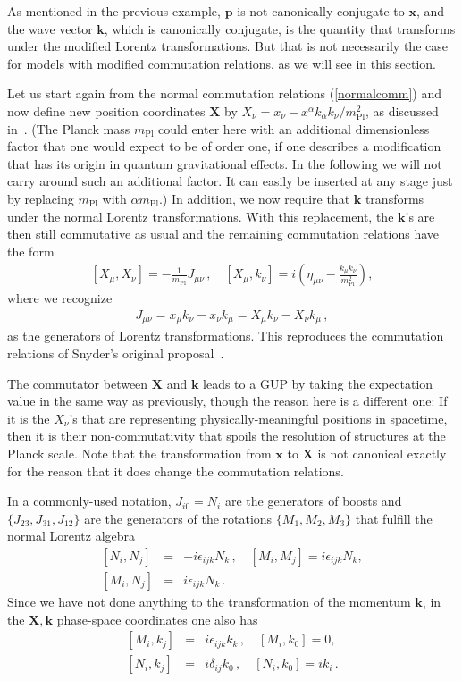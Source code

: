 \documentclass{article}
\def\beqn{\begin{eqnarray}}
\def\eeqn{\end{eqnarray}}
\begin{document}
As mentioned in the previous example, $\mathbf{p}$ is not canonically conjugate to $\mathbf{x}$,
and the wave vector $\mathbf{k}$, which is canonically conjugate, is the quantity that transforms under the modified Lorentz transformations. 
But that is not necessarily the case for models with modified commutation relations, as we will see in this section.

Let us start again from the normal commutation relations (\ref{normalcomm}) and now define new position coordinates $\mathbf{X}$ by $X_\nu = x_\nu - x^\alpha k_\alpha k_\nu/ m_{\mathrm{Pl}}^2$, as discussed in~\cite{Girelli:2007sz}. (The Planck mass $m_{\mathrm{Pl}}$ could enter here with an additional
dimensionless factor that one would expect to be of order one, if one describes a modification that has its origin in quantum 
gravitational effects. In the following we will not carry around
such an additional factor. It can easily be inserted at any stage just by replacing $m_{\mathrm{Pl}}$ with $\alpha m_{\mathrm{Pl}}$.) In addition, we
now require that $\mathbf{k}$ transforms under the normal Lorentz transformations. With this
replacement, the $\mathbf{k}$'s are then still commutative as usual and the remaining commutation relations have the form
\beqn
\left[ X_\mu, X_\nu \right] = - \frac{1}{m_{\mathrm{Pl}}} J_{\mu \nu} \,, \quad \left[ X_\mu, k_\nu \right] = i \left( \eta_{\mu\nu} - \frac{k_\mu k_\nu}{m_{\mathrm{Pl}}^2} \right) , \label{Snydercomm}
\eeqn
where we recognize
\beqn
J_{\mu \nu} = x_\mu k_\nu - x_\nu k_\mu = X_\mu k_\nu - X_\nu k_\mu \,,
\eeqn
as the generators of Lorentz transformations.  This reproduces the commutation relations of Snyder's original proposal~\cite{Snyder}.

The commutator between $\mathbf{X}$ and $\mathbf{k}$ leads to a {\sc GUP} by taking the expectation value in the same way as previously, though the
reason here is a different one: If it is the $X_\nu$'s that are representing physically-meaningful positions in 
spacetime, then it is their non-commutativity that spoils the resolution of structures at the Planck scale. Note that the
transformation from $\mathbf{x}$ to $\mathbf{X}$ is not canonical exactly for the reason that it does change the commutation
relations. 

In a commonly-used notation, $J_{i0} = N_i$ are the generators of
boosts and $\{ J_{23}, J_{31}, J_{12} \}$ are the generators of the rotations $\{M_1, M_2, M_3\}$
that fulfill the normal Lorentz algebra
\beqn
\left[N_i, N_j \right] &=& - i \epsilon_{ijk} N_k \,, \quad \left[M_i, M_j \right] = i \epsilon_{ijk} N_k,\nonumber\\
\left[M_i, N_j \right] &=& i \epsilon_{ijk} N_k \,. \label{normallorentz}
\eeqn
Since we have not done anything to the transformation of the momentum $\mathbf{k}$, in the $\mathbf{X},\mathbf{k}$ phase-space coordinates one also has
\beqn
\left[M_i, k_j\right] &=& i \epsilon_{ijk} k_k \,,\quad \left[M_i, k_0\right] = 0, \nonumber\\
\left[N_i, k_j\right] &=& i \delta_{ij} k_0 \,,\quad \left[N_i, k_0\right] = i k_i \,. \label{normallorentz2} 
\eeqn
\end{document}
